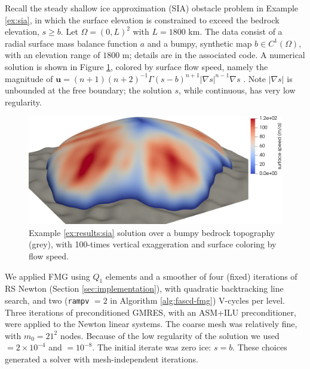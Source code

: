 \documentclass[review,hidelinks,onefignum,onetabnum,final]{siamart220329}  %
\newcommand{\grad}{\nabla}
\begin{document}
\begin{example}   \label{ex:results:sia}
Recall the steady shallow ice approximation (SIA) obstacle problem in Example \ref{ex:sia}, in which the surface elevation is constrained to exceed the bedrock elevation, $s\ge b$.  Let $\Omega=(0,L)^2$ with $L=1800$ km.  The data consist of a radial surface mass balance function $a$ \cite[equation (5.122)]{GreveBlatter2009} and a bumpy, synthetic map $b\in C^1(\Omega)$, with an elevation range of $1800$ m; details are in the associated code.  A numerical solution is shown in Figure \ref{fig:results:siascene}, colored by surface flow speed, namely the magnitude of $\mathbf{u} = (n+1)(n+2)^{-1} \Gamma (s-b)^{n+1} |\grad s|^{n-1} \grad s$ \cite{GreveBlatter2009}.  Note $|\grad s|$ is unbounded at the free boundary; the solution $s$, while continuous, has very low regularity.

\begin{figure}[ht]
\centering
\includegraphics[width=1.0\textwidth]{sialev8scene.png}
\caption{Example \ref{ex:results:sia} solution over a bumpy bedrock topography (grey), with 100-times vertical exaggeration and surface coloring by flow speed.}
\label{fig:results:siascene}
\end{figure}

We applied FMG using $Q_1$ elements and a smoother of four (fixed) iterations of RS Newton (Section \ref{sec:implementation}), with quadratic backtracking line search, and two (\texttt{rampv} $=2$ in Algorithm \ref{alg:fascd-fmg}) V-cycles per level.  Three iterations of preconditioned GMRES, with an ASM+ILU preconditioner, were applied to the Newton linear systems.  The coarse mesh was relatively fine, with $m_0=21^2$ nodes.  Because of the low regularity of the solution we used  $= 2 \times 10^{-4}$ and  $= 10^{-8}$.  The initial iterate was zero ice: $s=b$.  These choices generated a solver with mesh-independent iterations.


\end{example}
\end{document}
